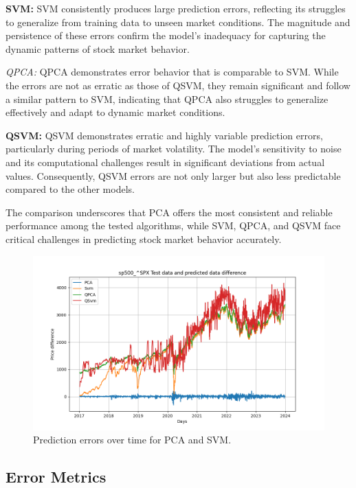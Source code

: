 \documentclass[journal]{IEEEtran}
\begin{document}
\textbf{SVM:} SVM consistently produces large prediction errors, reflecting its struggles to generalize from training data to unseen market conditions. The magnitude and persistence of these errors confirm the model's inadequacy for capturing the dynamic patterns of stock market behavior.

\textit{QPCA:} QPCA demonstrates error behavior that is comparable to SVM. While the errors are not as erratic as those of QSVM, they remain significant and follow a similar pattern to SVM, indicating that QPCA also struggles to generalize effectively and adapt to dynamic market conditions.

\textbf{QSVM:} QSVM demonstrates erratic and highly variable prediction errors, particularly during periods of market volatility. The model's sensitivity to noise and its computational challenges result in significant deviations from actual values. Consequently, QSVM errors are not only larger but also less predictable compared to the other models.

The comparison underscores that PCA offers the most consistent and reliable performance among the tested algorithms, while SVM, QPCA, and QSVM face critical challenges in predicting stock market behavior accurately.


\begin{figure}[ht!]
    \centering
    \includegraphics[width=\linewidth]{prediction_error.png}
    \caption{Prediction errors over time for PCA and SVM.}
    \label{fig:error_comparison}
\end{figure}

\subsection{Error Metrics}
\end{document}
